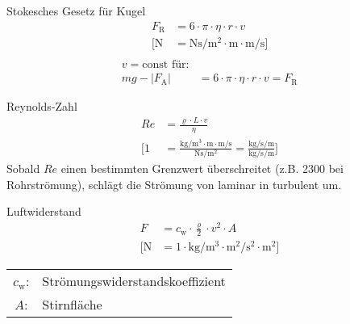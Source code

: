 \begin{karte}{Stokesches Gesetz für Kugel}
    \begin{align*}
        F_\text{R} &= 6 \cdot \pi \cdot \eta \cdot r \cdot v \\
        \bigg[ \si{\newton} &= \si{\newton\second\per\square\meter} \cdot \si{\meter} \cdot\si{\meter\per\second} \bigg] \\
    \end{align*}
    \begin{align*}
        v = \text{const für:}& \\
        mg - \left| F_\text{A} \right| &= 6 \cdot \pi \cdot \eta \cdot r \cdot v = F_\text{R}
    \end{align*}
\end{karte}

\begin{karte}{Reynolds-Zahl}
    \begin{align*}
        \mathit{Re} &= \frac{\varrho \cdot L \cdot v}{\eta} \\
        \Bigg[ 1 &= \frac{\si{\kilogram\per\cubic\meter} \cdot \si{\meter} \cdot \si{\meter\per\second}}{\si{\newton\second\per\square\meter}} 
            = \frac{\si{\kilogram\per\second\per\meter}}{\si{\kilogram \per\second\per\meter }}
            \Bigg]
    \end{align*}
    Sobald \(\mathit{Re}\) einen bestimmten Grenzwert über\-schreitet (z.B. 2300 bei Rohrströmung), schlägt die Strömung von laminar in turbulent um.
\end{karte}

\begin{karte}{Luftwiderstand}
    \begin{align*}
        F &=  c_\mathrm w \cdot \frac{\varrho}{2} \cdot v^2 \cdot A \\
        \bigg[ \si{\newton} &= 1 \cdot \si{\kilogram\per\cubic\meter} \cdot \si{\square\meter\per\square\second} \cdot \si{\square\meter} \bigg]
    \end{align*}
     \begin{tabular}[t]{cl}
         \(c_\mathrm w\):& Strömungswiderstandskoeffizient \\
         \(A\): &Stirnfläche
     \end{tabular}

\end{karte}

